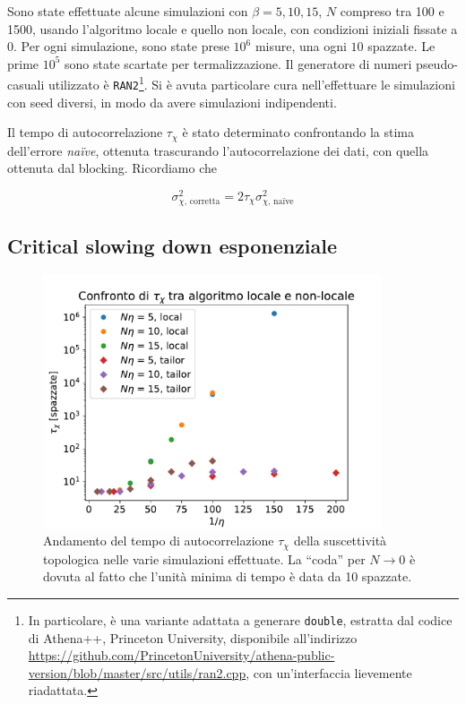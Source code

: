 \documentclass[a4paper,11pt]{article}
\newcommand{\code}[1]{\texttt{#1}}
\begin{document}
    Sono state effettuate alcune simulazioni con $\beta = 5, 10, 15$, $N$ compreso tra 100 e 1500, usando l'algoritmo locale e quello non locale, con condizioni iniziali fissate a 0. Per ogni simulazione, sono state prese $10^6$ misure, una ogni $10$ spazzate. Le prime $10^5$ sono state scartate per termalizzazione. Il generatore di numeri pseudo-casuali utilizzato è \code{RAN2}\footnote{In particolare, è una variante adattata a generare \code{double}, estratta dal codice di Athena++, Princeton University, disponibile all'indirizzo \url{https://github.com/PrincetonUniversity/athena-public-version/blob/master/src/utils/ran2.cpp}, con un'interfaccia lievemente riadattata.}. Si è avuta particolare cura nell'effettuare le simulazioni con seed diversi, in modo da avere simulazioni indipendenti.
    
    Il tempo di autocorrelazione $\tau_\chi$ è stato determinato confrontando la stima dell'errore \emph{naïve}, ottenuta trascurando l'autocorrelazione dei dati, con quella ottenuta dal blocking. Ricordiamo che
    
    \begin{equation}
        \sigma^2_{\chi \text{, corretta}} = 2 \tau_\chi \sigma^2_{\chi \text{, naïve}}
    \end{equation}

    
    \subsection{Critical slowing down esponenziale}
    
    \begin{figure}[hptb]
        \centering
        \includegraphics[width=10cm]{figure/csd_autocorr.pdf}
        \caption{Andamento del tempo di autocorrelazione $\tau_\chi$ della suscettività topologica nelle varie simulazioni effettuate. La ``coda'' per $N \to 0$ è dovuta al fatto che l'unità minima di tempo è data da 10 spazzate.}
        \label{fig:csd_autocorr}
    \end{figure}
\end{document}
